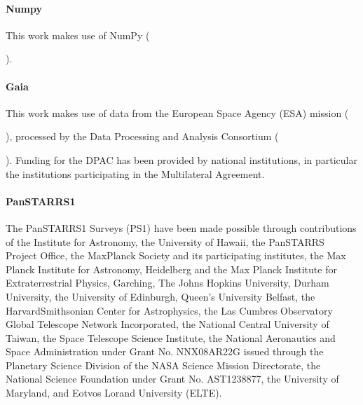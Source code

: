 \documentclass[letterpaper,11pt,english]{sphinxmanual}
\begin{document}
\paragraph{Numpy}
\label{\detokenize{user/citations:numpy}}
\sphinxAtStartPar
This work makes use of NumPy
(%
\begin{footnote}[15]\sphinxAtStartFootnote
{}
%
\end{footnote}).


\paragraph{Gaia}
\label{\detokenize{user/citations:gaia}}
\sphinxAtStartPar
This work makes use of data from the European Space Agency (ESA) mission 
(%
\begin{footnote}[16]\sphinxAtStartFootnote
{}
%
\end{footnote}), processed by the  Data
Processing and Analysis Consortium
(%
\begin{footnote}[17]\sphinxAtStartFootnote
{}
%
\end{footnote}). Funding for
the DPAC has been provided by national institutions, in particular the
institutions participating in the  Multilateral Agreement.


\paragraph{Pan\sphinxhyphen{}STARRS1}
\label{\detokenize{user/citations:pan-starrs1}}
\sphinxAtStartPar
The Pan\sphinxhyphen{}STARRS1 Surveys (PS1) have been made possible through contributions of
the Institute for Astronomy, the University of Hawaii, the Pan\sphinxhyphen{}STARRS Project
Office, the Max\sphinxhyphen{}Planck Society and its participating institutes, the Max Planck
Institute for Astronomy, Heidelberg and the Max Planck Institute for
Extraterrestrial Physics, Garching, The Johns Hopkins University, Durham
University, the University of Edinburgh, Queen’s University Belfast, the
Harvard\sphinxhyphen{}Smithsonian Center for Astrophysics, the Las Cumbres Observatory
Global Telescope Network Incorporated, the National Central University of
Taiwan, the Space Telescope Science Institute, the National Aeronautics and
Space Administration under Grant No. NNX08AR22G issued through the Planetary
Science Division of the NASA Science Mission Directorate, the National
Science Foundation under Grant No. AST\sphinxhyphen{}1238877, the University of Maryland,
and Eotvos Lorand University (ELTE).
\end{document}
